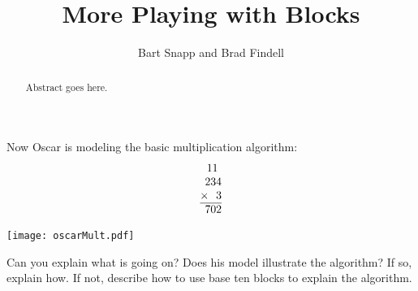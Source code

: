 \documentclass{ximera}
\title{More Playing with Blocks}
\author{Bart Snapp and Brad Findell}
\begin{document}
\begin{abstract}
Abstract goes here.  
\end{abstract}
\maketitle

\label{A:B2} 


\begin{problem}
Now Oscar is modeling the basic multiplication algorithm:
\[
\normalfont
\begin{tabular}{@{}r@{}}
11~~\\
234\\
$\times$~~3\\ \hline
702
\end{tabular}
\]
\begin{image}
\texttt{[image: oscarMult.pdf]}
\end{image}
Can you explain what is going on?  Does his model illustrate the algorithm?  If so, explain how.  If not, describe how to use base ten blocks to explain the algorithm.  
\end{problem}
\end{document}
